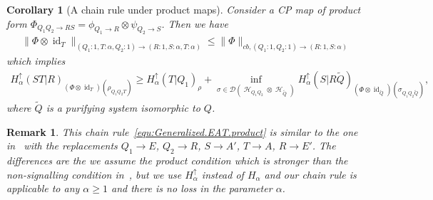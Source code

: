 \documentclass[11pt]{article}
\DeclareMathOperator{\id}{id}
\newcommand{\1}{\ensuremath{\mathbbm{1}}}
\theoremstyle{newdefinition}
\theoremstyle{newplain}
\newtheorem{corollary}[definition]{Corollary}
\newtheorem{remark}[definition]{Remark}
\theoremstyle{myplain}
\DeclareMathOperator{\cH}{\mathcal{H}}
\begin{document}
\begin{corollary}[A chain rule under product maps]\label{cor:generalized.eat.chain.rule}
Consider a CP map of product form $\Phi_{Q_1Q_2 \to RS} = \phi_{Q_1 \to R} \otimes \psi_{Q_2 \to S}$. Then we have
\begin{align}
\label{equ:Generalized.EAT.product.norm}
\|\Phi\otimes\id_T\|_{(Q_1:1,T:\alpha,Q_2:1)\to(R:1,S:\alpha,T:\alpha)} \leq \|\Phi\|_{cb,(Q_1:1,Q_2:1)\to (R:1,S:\alpha)} 
\end{align}
which implies
\begin{align}\label{equ:Generalized.EAT.product}
H^{\uparrow}_\alpha(ST|R)_{(\Phi 
\otimes \id_T)(\rho_{Q_{1}Q_{2}T})} \geq H^{\uparrow}_\alpha(T|Q_1)_{\rho} + \inf_{\sigma \in \mathcal{D}(\cH_{Q_1Q_2} \otimes \cH_{\tilde{Q}})} H^{\uparrow}_\alpha(S|R \tilde{Q})_{(\Phi \otimes \id_{\tilde{Q}})(\sigma_{Q_1Q_2\tilde{Q}})},
\end{align} where $\tilde{Q}$ is a purifying system isomorphic to $Q$. 
\end{corollary}
\begin{remark}
This chain rule~\eqref{equ:Generalized.EAT.product} is similar to the one in~\cite[Lemma 3.6]{Metger.2024} with the replacements $Q_1 \to E$, $Q_2 \to R$, $S \to A'$, $T \to A$, $R \to E'$. The differences are the we assume the product condition which is stronger than the non-signalling condition in~\cite[Lemma 3.6]{Metger.2024}, but we use $H_{\alpha}^{\uparrow}$ instead of $H_{\alpha}$ and our chain rule is applicable to any $\alpha \geq 1$ and there is no loss in the parameter $\alpha$. 
\end{remark}
\end{document}
